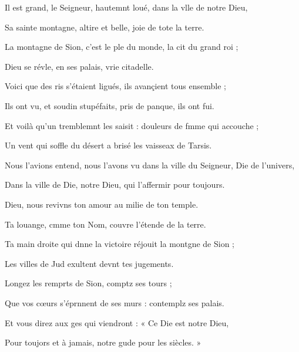 \item Il est grand, le Seigneur, hautemnt loué,\psstar{} dans la vlle de notre Dieu,
\item Sa sainte montagne, altire et belle,\psstar{} joie de tote la terre.
\item La montagne de Sion, c’est le ple du monde,\psstar{} la cit du grand roi ;
\item Dieu se révle, en ses palais,\psstar{} vrie citadelle.
\item Voici que des ris s’étaient ligués,\psstar{} ils avançient tous ensemble ;
\item Ils ont vu, et soudin stupéfaits,\psstar{} pris de panque, ils ont fui.
\item Et voilà qu’un tremblemnt les saisit :\psstar{} douleurs de fmme qui accouche ;
\item Un vent qui soffle du désert\psstar{} a brisé les vaisseax de Tarsis.
\item Nous l’avions entend, nous l’avons vu\psstar{} dans la ville du Seigneur, Die de l’univers,
\item Dans la ville de Die, notre Dieu,\psstar{} qui l’affermir pour toujours.
\item Dieu, nous revivns ton amour\psstar{} au milie de ton temple.
\item Ta louange, cmme ton Nom,\psstar{} couvre l’étende de la terre.
\item Ta main droite qui dnne la victoire\psstar{} réjouit la montgne de Sion ;
\item Les villes de Jud exultent\psstar{} devnt tes jugements.
\item Longez les remprts de Sion,\psstar{} comptz ses tours ;
\item Que vos cœurs s’éprnnent de ses murs :\psstar{} contemplz ses palais.
\item Et vous direz aux ges qui viendront :\psstar{} « Ce Die est notre Dieu,
\item Pour toujors et à jamais,\psstar{} notre gude pour les siècles. »